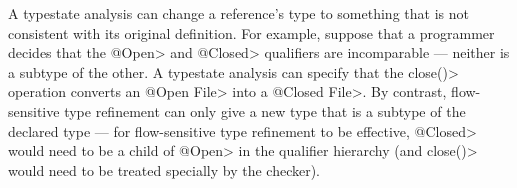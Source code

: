 A typestate analysis can change a reference's type to something that is not
consistent with its original definition.  For example, suppose that a
programmer decides that the \<@Open> and \<@Closed> qualifiers are
incomparable --- neither is a subtype of the other.  A typestate analysis
can specify that the \<close()> operation converts an \<@Open File> into a
\<@Closed File>.  By contrast, flow-sensitive type refinement can only give
a new type that is a subtype of the declared type --- for flow-sensitive
type refinement to be effective, \<@Closed> would need to be a child of
\<@Open> in the qualifier hierarchy (and \<close()> would need to be
treated specially by the checker).


